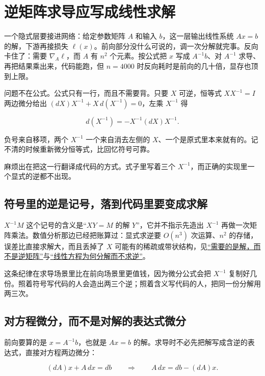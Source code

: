 \section{逆矩阵求导应写成线性求解}
\label{sec:10-Matrix-Calculus/03-Trace-Calculus/02}

一个隐式层要接进网络：给定参数矩阵 \(A\) 和输入 \(b\)，这一层输出线性系统 \(Ax=b\) 的解，下游再接损失 \(\ell(x)\)。前向部分没什么可说的，调一次分解就完事。反向卡住了：需要 \(\nabla_A\ell\)，而 \(A\) 有 \(n^2\) 个元素。按公式把 \(x\) 写成 \(A^{-1}b\)、对 \(A^{-1}\) 求导、再把结果乘出来，代码能跑，但 \(n=4000\) 时反向耗时是前向的几十倍，显存也顶到上限。

问题不在公式。公式只有一行，而且不需要背。只要 \(X\) 可逆，恒等式 \(XX^{-1}=I\) 两边微分给出 \((dX)X^{-1}+X\,d(X^{-1})=0\)，左乘 \(X^{-1}\) 得

\[
d(X^{-1})=-X^{-1}(dX)X^{-1}.
\]

负号来自移项，两个 \(X^{-1}\) 一个来自消去左侧的 \(X\)、一个是原式里本来就有的。记不清的时候重新微分恒等式，比回忆符号可靠。

麻烦出在把这一行翻译成代码的方式。式子里写着三个 \(X^{-1}\)，而正确的实现里一个显式的逆都不出现。

\subsection{符号里的逆是记号，落到代码里要变成求解}

\(X^{-1}M\) 这个记号的含义是``\(XY=M\) 的解 \(Y\)''，它并不指示先造出 \(X^{-1}\) 再做一次矩阵乘法。数值分析那边已经把账算过：显式求逆要 \(O(n^3)\) 次运算、\(n^2\) 的存储，误差比直接求解大，而且丢掉了 \(X\) 可能有的稀疏或带状结构，见\hyperref[sec:08-Numerical-Analysis/07-Numerical-Methods-for-ML/03]{``需要的是解，而不是逆矩阵''}与\hyperref[sec:08-Numerical-Analysis/05-Numerical-Linear-Algebra/01]{``线性方程为何分解而不求逆''}。

这条纪律在求导场景里比在前向场景里更值钱，因为微分公式会把 \(X^{-1}\) 复制好几份。照着符号写代码的人会造出两三个逆；照着含义写代码的人，把同一份分解用两三次。

\subsection{对方程微分，而不是对解的表达式微分}

前向要算的是 \(x=A^{-1}b\)，也就是 \(Ax=b\) 的解。求导时不必先把解写成含逆的表达式，直接对方程两边微分：

\[
(dA)x+A\,dx=db
\qquad\Longrightarrow\qquad
A\,dx=db-(dA)x.
\]

